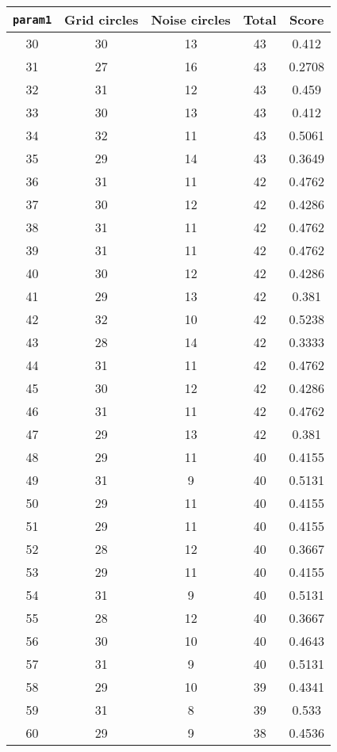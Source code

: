 \documentclass[letterpaper, 12pt]{article}
\begin{document}
\begin{longtable}{|c|c|c|c|c|}
\hline
\textbf{\texttt{param1}} & \textbf{Grid circles} & \textbf{Noise circles} & \textbf{Total} & \textbf{Score} \\
\hline
30 & 30 & 13 & 43 & 0.412 \\
\hline
31 & 27 & 16 & 43 & 0.2708 \\
\hline
32 & 31 & 12 & 43 & 0.459 \\
\hline
33 & 30 & 13 & 43 & 0.412 \\
\hline
34 & 32 & 11 & 43 & 0.5061 \\
\hline
35 & 29 & 14 & 43 & 0.3649 \\
\hline
36 & 31 & 11 & 42 & 0.4762 \\
\hline
37 & 30 & 12 & 42 & 0.4286 \\
\hline
38 & 31 & 11 & 42 & 0.4762 \\
\hline
39 & 31 & 11 & 42 & 0.4762 \\
\hline
40 & 30 & 12 & 42 & 0.4286 \\
\hline
41 & 29 & 13 & 42 & 0.381 \\
\hline
42 & 32 & 10 & 42 & 0.5238 \\
\hline
43 & 28 & 14 & 42 & 0.3333 \\
\hline
44 & 31 & 11 & 42 & 0.4762 \\
\hline
45 & 30 & 12 & 42 & 0.4286 \\
\hline
46 & 31 & 11 & 42 & 0.4762 \\
\hline
47 & 29 & 13 & 42 & 0.381 \\
\hline
48 & 29 & 11 & 40 & 0.4155 \\
\hline
49 & 31 & 9 & 40 & 0.5131 \\
\hline
50 & 29 & 11 & 40 & 0.4155 \\
\hline
51 & 29 & 11 & 40 & 0.4155 \\
\hline
52 & 28 & 12 & 40 & 0.3667 \\
\hline
53 & 29 & 11 & 40 & 0.4155 \\
\hline
54 & 31 & 9 & 40 & 0.5131 \\
\hline
55 & 28 & 12 & 40 & 0.3667 \\
\hline
56 & 30 & 10 & 40 & 0.4643 \\
\hline
57 & 31 & 9 & 40 & 0.5131 \\
\hline
58 & 29 & 10 & 39 & 0.4341 \\
\hline
59 & 31 & 8 & 39 & 0.533 \\
\hline
60 & 29 & 9 & 38 & 0.4536 \\

\end{longtable}
\end{document}

